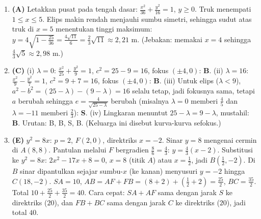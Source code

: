 \documentclass[a4paper,11pt]{article}
\newcounter{no}
\begin{document}
\begin{enumerate}[leftmargin=2em,itemsep=2pt,topsep=2pt]
\item[\textbf{18.}] \textbf{(A)} Letakkan pusat pada tengah dasar: $\frac{x^2}{36}+\frac{y^2}{16}=1$, $y\ge0$. Truk menempati $1\le x\le5$. Elips makin rendah menjauhi sumbu simetri, sehingga sudut atas truk di $x=5$ menentukan tinggi maksimum: $y=4\sqrt{1-\frac{25}{36}}=\frac{4\sqrt{11}}6=\frac23\sqrt{11}\approx2{,}21$ m. (Jebakan: memakai $x=4$ sehingga $\frac43\sqrt5\approx2{,}98$ m.)
\item[\textbf{19.}] \textbf{(C)} (i) $\lambda=0$: $\frac{x^2}{25}+\frac{y^2}9=1$, $c^2=25-9=16$, fokus $(\pm4,0)$: \textbf{B}. (ii) $\lambda=16$: $\frac{x^2}9-\frac{y^2}7=1$, $c^2=9+7=16$, fokus $(\pm4,0)$: \textbf{B}. (iii) Untuk elips ($\lambda<9$), $a^2-b^2=(25-\lambda)-(9-\lambda)=16$ selalu tetap, jadi fokusnya sama, tetapi $a$ berubah sehingga $e=\frac4{\sqrt{25-\lambda}}$ berubah (misalnya $\lambda=0$ memberi $\frac45$ dan $\lambda=-11$ memberi $\frac23$): \textbf{S}. (iv) Lingkaran menuntut $25-\lambda=9-\lambda$, mustahil: \textbf{B}. Urutan: B, B, S, B. (Keluarga ini disebut kurva-kurva sefokus.)
\item[\textbf{20.}] \textbf{(E)} $y^2=8x$: $p=2$, $F(2,0)$, direktriks $x=-2$. Sinar $y=8$ mengenai cermin di $A(8,8)$. Pantulan melalui $F$ bergradien $\frac{8}{6}=\frac43$: $y=\frac43(x-2)$. Substitusi ke $y^2=8x$: $2x^2-17x+8=0$, $x=8$ (titik $A$) atau $x=\frac12$, jadi $B\left(\frac12,-2\right)$. Di $B$ sinar dipantulkan sejajar sumbu-$x$ (ke kanan) menyusuri $y=-2$ hingga $C(18,-2)$. $SA=10$, $AB=AF+FB=(8+2)+\left(\frac12+2\right)=\frac{25}2$, $BC=\frac{35}2$. Total $10+\frac{25}2+\frac{35}2=40$. Cara cepat: $SA+AF$ sama dengan jarak $S$ ke direktriks ($20$), dan $FB+BC$ sama dengan jarak $C$ ke direktriks ($20$), jadi total $40$.
\end{enumerate}
\par{}\par\vspace{0.2em}
\end{document}
